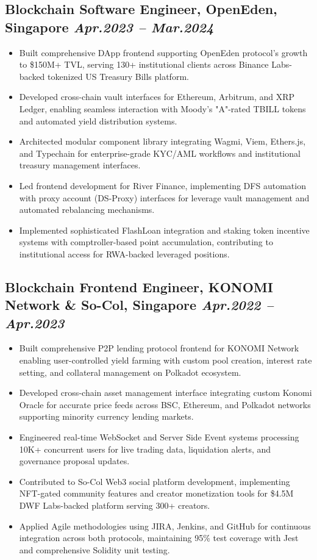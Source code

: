 \documentclass[11pt,a4paper]{article}
\newcommand{\resumeItem}[1]{\item\small{#1}}
\begin{document}
\subsection{Blockchain Software Engineer, OpenEden, Singapore \hfill \textit{Apr.2023 -- Mar.2024}}
\begin{itemize}[leftmargin=*, itemsep=1pt, parsep=0pt]
    \resumeItem{Built comprehensive DApp frontend supporting OpenEden protocol's growth to \$150M+ TVL, serving 130+ institutional clients across Binance Labs-backed tokenized US Treasury Bills platform.}
    \resumeItem{Developed cross-chain vault interfaces for Ethereum, Arbitrum, and XRP Ledger, enabling seamless interaction with Moody's "A"-rated TBILL tokens and automated yield distribution systems.}
    \resumeItem{Architected modular component library integrating Wagmi, Viem, Ethers.js, and Typechain for enterprise-grade KYC/AML workflows and institutional treasury management interfaces.}
    \resumeItem{Led frontend development for River Finance, implementing DFS automation with proxy account (DS-Proxy) interfaces for leverage vault management and automated rebalancing mechanisms.}
    \resumeItem{Implemented sophisticated FlashLoan integration and staking token incentive systems with comptroller-based point accumulation, contributing to institutional access for RWA-backed leveraged positions.}
\end{itemize}

\subsection{Blockchain Frontend Engineer, KONOMI Network \& So-Col, Singapore \hfill \textit{Apr.2022 -- Apr.2023}}
\begin{itemize}[leftmargin=*, itemsep=1pt, parsep=0pt]
    \resumeItem{Built comprehensive P2P lending protocol frontend for KONOMI Network enabling user-controlled yield farming with custom pool creation, interest rate setting, and collateral management on Polkadot ecosystem.}
    \resumeItem{Developed cross-chain asset management interface integrating custom Konomi Oracle for accurate price feeds across BSC, Ethereum, and Polkadot networks supporting minority currency lending markets.}
    \resumeItem{Engineered real-time WebSocket and Server Side Event systems processing 10K+ concurrent users for live trading data, liquidation alerts, and governance proposal updates.}
    \resumeItem{Contributed to So-Col Web3 social platform development, implementing NFT-gated community features and creator monetization tools for \$4.5M DWF Labs-backed platform serving 300+ creators.}
    \resumeItem{Applied Agile methodologies using JIRA, Jenkins, and GitHub for continuous integration across both protocols, maintaining 95\% test coverage with Jest and comprehensive Solidity unit testing.}
\end{itemize}
\end{document}
